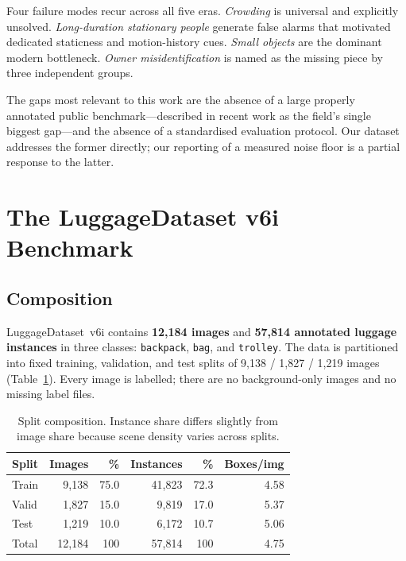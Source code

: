 \documentclass[10pt,twocolumn,a4paper]{article}
\begin{document}
Four failure modes recur across all five eras. \emph{Crowding} is universal and
explicitly unsolved. \emph{Long-duration stationary people} generate false alarms
that motivated dedicated staticness and motion-history cues. \emph{Small objects}
are the dominant modern bottleneck. \emph{Owner misidentification} is named as the
missing piece by three independent groups.

The gaps most relevant to this work are the absence of a large properly annotated
public benchmark---described in recent work as the field's single biggest
gap---and the absence of a standardised evaluation protocol. Our dataset addresses
the former directly; our reporting of a measured noise floor is a partial response
to the latter.

\section{The LuggageDataset v6i Benchmark}
\label{sec:dataset}

\subsection{Composition}

LuggageDataset~v6i contains \textbf{12{,}184 images} and \textbf{57{,}814
annotated luggage instances} in three classes: \texttt{backpack}, \texttt{bag},
and \texttt{trolley}. The data is partitioned into fixed training, validation, and
test splits of 9{,}138 / 1{,}827 / 1{,}219 images (Table~\ref{tab:splits}). Every
image is labelled; there are no background-only images and no missing label files.

\begin{table}[t]
\centering
\caption{Split composition. Instance share differs slightly from image share
because scene density varies across splits.}
\label{tab:splits}
\small
\begin{tabular}{@{}lrrrrr@{}}
\toprule
\textbf{Split} & \textbf{Images} & \textbf{\%} & \textbf{Instances} & \textbf{\%} & \textbf{Boxes/img} \\
\midrule
Train & 9{,}138 & 75.0 & 41{,}823 & 72.3 & 4.58 \\
Valid & 1{,}827 & 15.0 & 9{,}819  & 17.0 & 5.37 \\
Test  & 1{,}219 & 10.0 & 6{,}172  & 10.7 & 5.06 \\
\midrule
Total & 12{,}184 & 100 & 57{,}814 & 100 & 4.75 \\
\bottomrule
\end{tabular}
\end{table}
\end{document}
